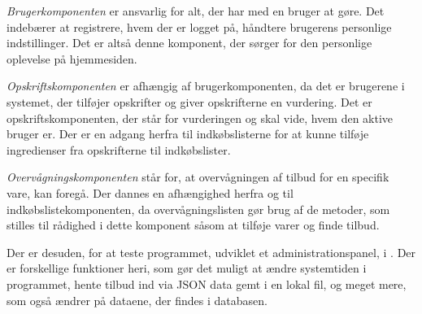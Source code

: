 \textit{Brugerkomponenten} er ansvarlig for alt, der har med en bruger at gøre. 
Det indebærer at registrere, hvem der er logget på, håndtere brugerens personlige indstillinger. 
Det er altså denne komponent, der sørger for den personlige oplevelse på hjemmesiden.

\textit{Opskriftskomponenten} er afhængig af brugerkomponenten, da det er brugerene i systemet, der tilføjer opskrifter og giver opskrifterne en vurdering.
Det er opskriftskomponenten, der står for vurderingen og skal vide, hvem den aktive bruger er.
Der er en adgang herfra til indkøbslisterne for at kunne tilføje ingredienser fra opskrifterne til indkøbslister.

\textit{Overvågningskomponenten} står for, at overvågningen af tilbud for en specifik vare, kan foregå.
Der dannes en afhængighed herfra og til indkøbslistekomponenten, da overvågningslisten gør brug af de metoder, som stilles til rådighed i dette komponent såsom at tilføje varer og finde tilbud.

Der er desuden, for at teste programmet, udviklet et administrationspanel, i . 
Der er forskellige funktioner heri, som gør det muligt at ændre systemtiden i programmet, hente tilbud ind via JSON data gemt i en lokal fil, og meget mere, som også ændrer på dataene, der findes i databasen.


